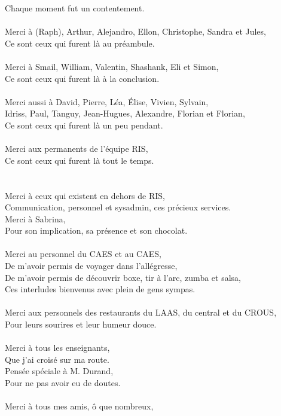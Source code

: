 \documentclass[english,a4paper,11pt,twoside]{StyleThese}
\begin{document}
Chaque moment fut un contentement.\\
\\
Merci à (Raph), Arthur, Alejandro, Ellon, Christophe, Sandra et Jules,\\
Ce sont ceux qui furent là au préambule.\\
\\
Merci à Smail, William, Valentin, Shashank, Eli et Simon,\\
Ce sont ceux qui furent là à la conclusion.\\
\\
Merci aussi à David, Pierre, Léa, Élise, Vivien, Sylvain,\\
Idriss, Paul, Tanguy, Jean-Hugues, Alexandre, Florian et Florian,\\
Ce sont ceux qui furent là un peu pendant.\\
\\
Merci aux permanents de l'équipe RIS,\\
Ce sont ceux qui furent là tout le temps.\\
\\
\\
Merci à ceux qui existent en dehors de RIS,\\
Communication, personnel et sysadmin, ces précieux services.\\
Merci à Sabrina,\\
Pour son implication, sa présence et son chocolat.\\
\\
Merci au personnel du CAES et au CAES,\\
De m'avoir permis de voyager dans l'allégresse,\\
De m'avoir permis de découvrir boxe, tir à l'arc, zumba et salsa,\\
Ces interludes bienvenus avec plein de gens sympas.\\
\\
Merci aux personnels des restaurants du LAAS, du central et du CROUS,\\
Pour leurs sourires et leur humeur douce.\\
\\
Merci à tous les enseignants,\\
Que j'ai croisé sur ma route.\\
Pensée spéciale à M. Durand,\\
Pour ne pas avoir eu de doutes.\\
\\
Merci à tous mes amis, ô que nombreux,\\
\end{document}
